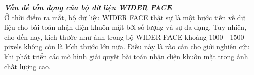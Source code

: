 {    \noindent
    \textbf{\textit{Vấn đề tồn đọng của bộ dữ liệu WIDER FACE}} \\
    Ở thời điểm ra mắt, bộ dữ liệu WIDER FACE thật sự là một bước tiến về dữ liệu cho bài toán nhận diện khuôn mặt bởi số lượng và sự đa dạng.
    Tuy nhiên, cho đến nay, kích thước như ảnh trong bộ WIDER FACE khoảng 1000 - 1500 pixels  không còn là kích thước lớn nữa.
    Điều này là rào cản cho giới nghiên cứu khi phát triển các mô hình giải quyết bài toán nhận diện khuôn mặt trong ảnh chất lượng cao.
}